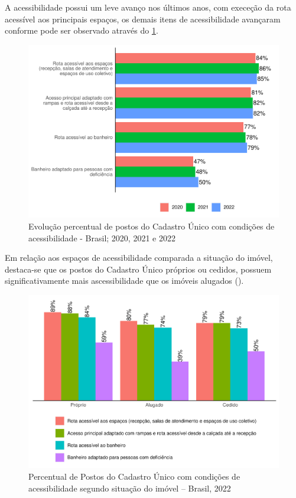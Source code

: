 \documentclass[
  brazilian]{report}
\begin{document}
A acessibilidade possui um leve avanço nos últimos anos, com execeção da
rota acessível aos principais espaços, os demais itens de acessibilidade
avançaram conforme pode ser observado através do
\cref{fig:postcad-acessibilidade}.

\begin{figure}
\includegraphics{Censo-SUAS-2022_files/figure-latex/postcad-acessibilidade-1} \caption[Evolução percentual de postos do Cadastro Único com condições de acessibilidade - Brasil]{Evolução percentual de postos do Cadastro Único com condições de acessibilidade - Brasil; 2020, 2021 e 2022}\label{fig:postcad-acessibilidade}
\end{figure}

Em relação aos espaços de acessibilidade comparada a situação do imóvel,
destaca-se que os postos do Cadastro Único próprios ou cedidos, possuem
significativamente mais ascessibilidade que os imóveis alugados
().

\begin{figure}
\includegraphics{Censo-SUAS-2022_files/figure-latex/postcad-acessibilidade-situacao-1} \caption[Percentual de Postos do Cadastro Único com condições de acessibilidade segundo situação do imóvel – Brasil, 2022]{Percentual de Postos do Cadastro Único com condições de acessibilidade segundo situação do imóvel – Brasil, 2022}\label{fig:postcad-acessibilidade-situacao}
\end{figure}
\end{document}
